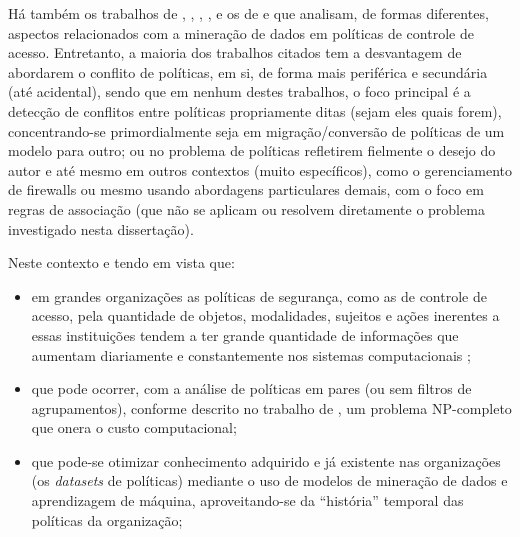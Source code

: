 \documentclass[
	12pt,				%
	openright,			%
	oneside,			%
	a4paper,			%
	english,			%
	french,				%
	spanish,			%
	brazil				%
	]{abntex2}
\begin{document}
Há também os trabalhos de , , , ,  e os de  e  que analisam, de formas diferentes, aspectos relacionados com a mineração de dados em políticas de controle de acesso. Entretanto, a maioria dos trabalhos citados tem a desvantagem de abordarem o conflito de políticas, em si, de forma mais periférica e secundária (até acidental), sendo que em nenhum destes trabalhos, o foco principal é a detecção de conflitos entre políticas propriamente ditas (sejam eles quais forem), concentrando-se primordialmente seja em migração/conversão de políticas de um modelo para outro; ou no problema de políticas refletirem fielmente o desejo do autor e até mesmo em outros contextos (muito específicos), como o gerenciamento de firewalls ou mesmo usando abordagens particulares demais, com o foco em regras de associação (que não se aplicam ou resolvem diretamente o problema investigado nesta dissertação).

Neste contexto e tendo em vista que: 
\begin{itemize}
	\item em grandes organizações as políticas de segurança, como as de controle de acesso, pela quantidade de objetos, modalidades, sujeitos e ações inerentes a essas instituições tendem a ter grande quantidade de informações que aumentam diariamente e constantemente nos sistemas computacionais \cite{fugini_information_2004, bellettini_role_2001, ueda_tese_2012};
	\item que pode ocorrer, com a análise de políticas em pares (ou sem filtros de agrupamentos), conforme descrito no trabalho de , um problema NP-completo que onera o custo computacional;
	\item que pode-se otimizar conhecimento adquirido e já existente nas organizações (os \textit{datasets} de políticas) mediante o uso de modelos de mineração de dados e aprendizagem de máquina, aproveitando-se da ``história'' temporal das políticas da organização;
\end{itemize}  
\end{document}
